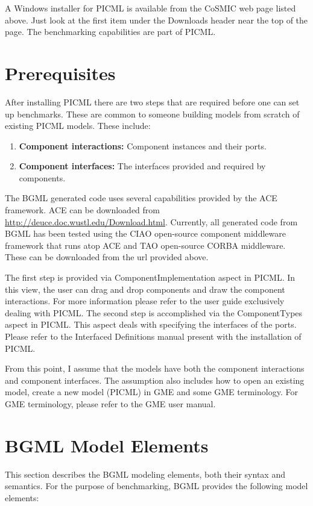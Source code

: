 \documentclass[onecolumn]{article}
\begin{document}
A Windows installer for PICML is available from the CoSMIC web page
listed above. Just look at the first item under the Downloads header
near the top of the page. The benchmarking capabilities are part of
PICML. 

\section* {Prerequisites}
After installing PICML there are two steps that are
required before one can set up benchmarks.  These are common to
someone building models from scratch of existing PICML models. These
include:
\sqztiny
\begin{enumerate}\crunchlist
\item {\bf Component interactions:} Component instances and their ports.
\item {\bf Component interfaces:} The interfaces provided and required by
components.
\end{enumerate}

\noindent The BGML generated code uses several capabilities provided
by the ACE framework. ACE can be downloaded from
\url{http://deuce.doc.wustl.edu/Download.html}. Currently, all
generated code from BGML has been tested using the CIAO open-source
component middleware framework that runs atop ACE and TAO open-source
CORBA middleware. These can be downloaded from the url provided above.

\noindent The first step is provided via ComponentImplementation aspect in
PICML. In this view, the user can drag and drop components and draw
the component interactions. For more information please refer to the
user guide exclusively dealing with PICML. The second step is accomplished via
the ComponentTypes aspect in PICML. This aspect deals with specifying
the interfaces of the ports. Please refer to the Interfaced
Definitions manual present with the installation of PICML.

From this point, I assume that the models have both the component
interactions and component interfaces.  The assumption also includes
how to open an existing model, create a new model (PICML) in GME and
some GME terminology. For GME terminology, please refer to the GME
user manual.

\section*{BGML Model Elements}

This section describes the BGML modeling elements, both their syntax
and semantics. For the purpose of benchmarking, BGML provides the
following model elements:
\end{document}
